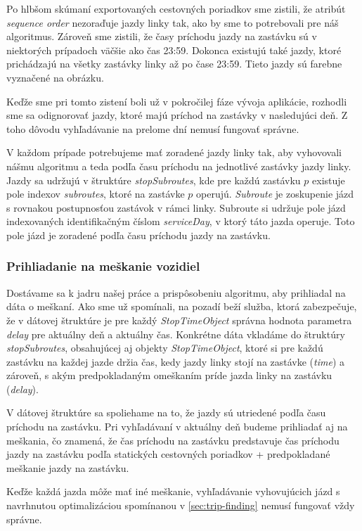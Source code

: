 Po hlbšom skúmaní exportovaných cestovných poriadkov sme zistili, že atribút \textit{sequence order} nezoraďuje jazdy linky tak, ako by sme to potrebovali pre náš algoritmus. Zároveň sme zistili, že časy príchodu jazdy na zastávku sú v niektorých prípadoch väčšie ako čas 23:59. Dokonca existujú také jazdy, ktoré prichádzajú na všetky zastávky linky až po čase 23:59. Tieto jazdy sú farebne vyznačené na obrázku.

Keďže sme pri tomto zistení boli už v pokročilej fáze vývoja aplikácie, rozhodli sme sa odignorovať jazdy, ktoré majú príchod na zastávky v nasledujúci deň. Z toho dôvodu vyhľadávanie na prelome dní nemusí fungovať správne.

V každom prípade potrebujeme mať zoradené jazdy linky tak, aby vyhovovali nášmu algoritmu a teda podľa času príchodu na jednotlivé zastávky jazdy linky. Jazdy sa udržujú v štruktúre \textit{stopSubroutes}, kde pre každú zastávku $p$ existuje pole indexov \textit{subroutes}, ktoré na zastávke $p$ operujú. \textit{Subroute} je zoskupenie jázd s rovnakou postupnosťou zastávok v rámci linky. Subroute si udržuje pole jázd indexovaných identifikačným číslom \textit{serviceDay}, v ktorý táto jazda operuje. Toto pole jázd je zoradené podľa času príchodu jazdy na zastávku. 

\subsubsection{Prihliadanie na meškanie vozidiel}
Dostávame sa k jadru našej práce a prispôsobeniu algoritmu, aby prihliadal na dáta o meškaní. Ako sme už spomínali, na pozadí beží služba, ktorá zabezpečuje, že v dátovej štruktúre je pre každý \textit{StopTimeObject} správna hodnota parametra \textit{delay} pre aktuálny deň a aktuálny čas. 
Konkrétne dáta vkladáme do štruktúry \textit{stopSubroutes}, obsahujúcej aj objekty \textit{StopTimeObject}, ktoré si pre každú zastávku na každej jazde držia čas, kedy jazdy linky stojí na zastávke (\textit{time}) a zároveň, s akým predpokladaným omeškaním príde jazda linky na zastávku (\textit{delay}). 

V dátovej štruktúre sa spoliehame na to, že jazdy sú utriedené podľa času príchodu na zastávku. Pri vyhľadávaní v aktuálny deň budeme prihliadať aj na meškania, čo znamená, že čas príchodu na zastávku predstavuje čas príchodu jazdy na zastávku podľa statických cestovných poriadkov + predpokladané meškanie jazdy na zastávku.

Keďže každá jazda môže mať iné meškanie, vyhľadávanie vyhovujúcich jázd s navrhnutou optimalizáciou spomínanou v \ref{sec:trip-finding} nemusí fungovať vždy správne. 

